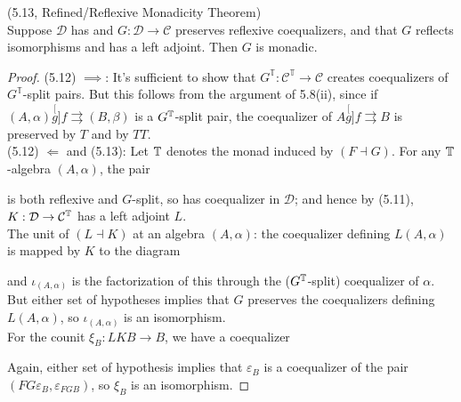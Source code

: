 \documentclass[a4paper]{article}
\begin{document}
\begin{thm} (5.13, Refined/Reflexive Monadicity Theorem)\\
    Suppose $\mathcal{D}$ has and $G:\mathcal{D} \to \mathcal{C}$ preserves reflexive coequalizers, and that $G$ reflects isomorphisms and has a left adjoint. Then $G$ is monadic.
    \begin{proof}
        (5.12) $\implies$: It's sufficient to show that $G^\mathbb{T}:\mathcal{C}^\mathbb{T} \to \mathcal{C}$ creates coequalizers of $G^\mathbb{T}$-split pairs. But this follows from the argument of 5.8(ii), since if $(A,\alpha) \stackrel[g]{f}{\rightrightarrows} (B,\beta)$ is a $G^{\mathbb{T}}$-split pair, the coequalizer of $A \stackrel[g]{f}{\rightrightarrows} B$ is preserved by $T$ and by $TT$.\\
        (5.12) $\Leftarrow$ and (5.13): Let $\mathbb{T}$ denotes the monad induced by $(F \dashv G)$. For any $\mathbb{T}$-algebra $(A,\alpha)$, the pair
        is both reflexive and $G$-split, so has coequalizer in $\mathcal{D}$; and hence by (5.11), $K:\mathcal{D} \to \mathcal{C}^{\mathbb{T}}$ has a left adjoint $L$.\\
        The unit of $(L \dashv K)$ at an algebra $(A,\alpha)$: the coequalizer defining $L(A,\alpha)$ is mapped by $K$ to the diagram


        and $\iota_{(A,\alpha)}$ is the factorization of this through the ($G^{\mathbb{T}}$-split) coequalizer of $\alpha$.\\
        But either set of hypotheses implies that $G$ preserves the coequalizers defining $L(A,\alpha)$, so $\iota_{(A,\alpha)}$ is an isomorphism.\\
        For the counit $\xi_B: LKB \to B$, we have a coequalizer


        Again, either set of hypothesis implies that $\varepsilon_B$ is a coequalizer of the pair $(FG\varepsilon_B, \varepsilon_{FGB})$, so $\xi_B$ is an isomorphism.
    \end{proof}
\end{thm}
\end{document}
